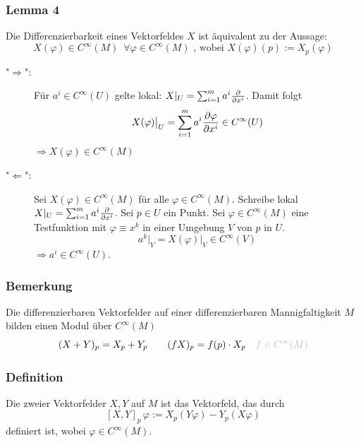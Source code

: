 \subsubsection[Lemma 4: Differenzierbarkeit eines Vektorfeldes]{Lemma 4} %
\label{ssub:212}
Die Differenzierbarkeit eines Vektorfeldes $X$ ist äquivalent zu der Aussage:
\[
	X(\varphi) \in C^\infty(M) \enspace\forall \varphi \in C^\infty(M) \text{ , wobei } X(\varphi)(p) := X_p(\varphi)
\]
\begin{description}
	\item["$\Rightarrow $":] Für $a^i \in C^\infty(U)$ gelte lokal: $X|_U = \sum_{i=1}^{m} a^i \frac{{\partial }}{{\partial x^i}}  $. Damit folgt
	\[
		X(\varphi)\big|_U = \sum_{i=1}^{m} a^i \frac{{\partial \varphi}}{{\partial x^i}}  \in C^\infty(U) 
	\] 
	$\Rightarrow X(\varphi) \in C^\infty(M)$
	\item["$\Leftarrow$":] Sei $X(\varphi) \in C^\infty(M)$ für alle $\varphi \in C^\infty(M)$. Schreibe lokal $X|_U = \sum_{i=1}^{m} a^i \frac{{\partial }}{{\partial x^i}} $. Sei $p\in U$  ein
	Punkt. Sei $\varphi \in C^\infty(M)$ eine Testfunktion mit $\varphi \equiv x^k$ in einer Umgebung $V$ von $p$ in $U$.
	\[
		a^k\big|_V = X(\varphi)|_V \in C^\infty(V)
	\]
	$\Rightarrow a^i \in C^\infty(U)$. \bewende
\end{description}

\subsubsection[Bemerkung: Modul der differenzierbaren Vektorfelder auf einer Mannigfaltigkeit]{Bemerkung} %
\label{ssub:213}
Die differenzierbaren Vektorfelder auf einer differenzierbaren Mannigfaltigkeit $M$ bilden einen Modul über $C^\infty(M)$
\[
	(X +Y)_p = X_p + Y_p \qquad (f X)_p = f(p) \cdot X_p \quad {\color{lightgray} f\in C^\infty(M)}
\]

\subsubsection[Definition: Lie-Klammer]{Definition} %
\label{ssub:214}
Die  zweier Vektorfelder $X,Y$ auf $M$ ist das Vektorfeld, das durch  
\[
	[X,Y]_p \, \varphi := X_p (Y \varphi) - Y_p(X \varphi)
\]
definiert ist, wobei $\varphi \in C^\infty(M)$.

